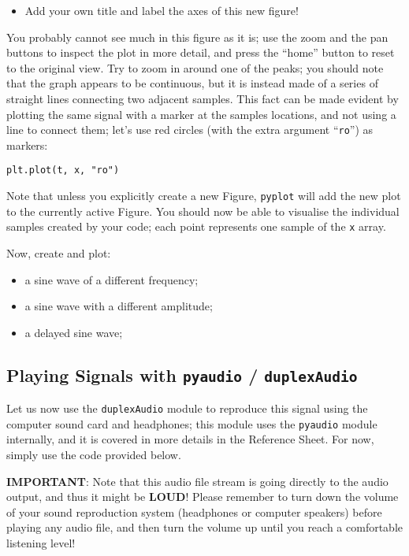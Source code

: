 \begin{itemize}
	\item Add your own title and label the axes of this new figure!
\end{itemize}

You probably cannot see much in this figure as it is; use the zoom and the pan buttons to inspect the plot in more detail, and press the ``home'' button to reset to the original view. Try to zoom in around one of the peaks; you should note that the graph appears to be continuous, but it is instead made of a series of straight lines connecting two adjacent samples. This fact can be made evident by plotting the same signal with a marker at the samples locations, and not using a line to connect them; let's use red circles (with the extra argument ``{\tt ro}'') as markers:

\begin{lstlisting}[frame=single]
plt.plot(t, x, "ro")
\end{lstlisting}

Note that unless you explicitly create a new Figure, {\tt pyplot} will add the new plot to the currently active Figure. You should now be able to visualise the individual samples created by your code; each point represents one sample of the {\tt x} array.

Now, create and plot:

\begin{itemize}
	\item a sine wave of a different frequency;
	\item a sine wave with a different amplitude;
	\item a delayed sine wave;
\end{itemize}

\subsection{Playing Signals with {\tt pyaudio} / {\tt duplexAudio}}

Let us now use the {\tt duplexAudio} module to reproduce this signal using the computer sound card and headphones; this module uses the {\tt pyaudio} module internally, and it is covered in more details in the Reference Sheet. For now, simply use the code provided below.

\textbf{IMPORTANT}: Note that this audio file stream is going directly to the audio output, and thus it might be \textbf{LOUD}! Please remember to turn down the volume of your sound reproduction system (headphones or computer speakers) before playing any audio file, and then turn the volume up until you reach a comfortable listening level!

